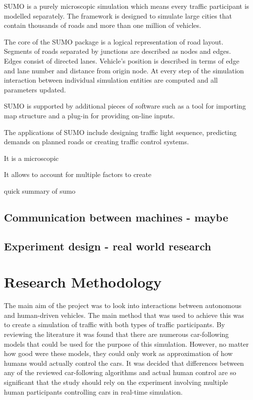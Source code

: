 \documentclass[11pt]{article}
\begin{document}
SUMO is a purely microscopic simulation which means every traffic participant is modelled separately. The framework is designed to simulate large cities that contain thousands of roads and more than one million of vehicles.

The core of the SUMO package is a logical representation of road layout. Segments of roads separated by junctions are described as nodes and edges. Edges consist of directed lanes. Vehicle's position is described in terms of edge and lane number and distance from origin node. At every step of the simulation interaction between individual simulation entities are computed and all parameters updated. 
\citep{krajzewicz2002sumo}

SUMO is supported by additional pieces of software such as a tool for importing map structure and a plug-in for providing on-line inputs.

The applications of SUMO include designing traffic light sequence, predicting demands on planned roads or creating traffic control systems.  


It is a microscopic

It allows to account for multiple factors to create 

quick summary of sumo
	


\subsection{Communication between machines - maybe}




\subsection{Experiment design - real world research}







\citet{parkin2016understanding}

\section{Research Methodology}

The main aim of the project was to look into interactions between autonomous and human-driven vehicles. The main method that was used to achieve this was to create a simulation of traffic with both types of traffic participants. By reviewing the literature it was found that there are numerous car-following models that could be used for the purpose of this simulation. However, no matter how good were these models, they could only work as approximation of how humans would actually control the cars. It was decided that differences between any of the reviewed car-following algorithms and actual human control are so significant that the study should rely on the experiment involving multiple human participants controlling cars in real-time simulation.
 
\end{document}
